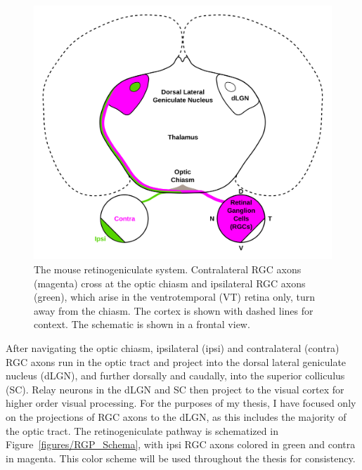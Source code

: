 \begin{figure}[hbtp]
	\begin{center}
		\includegraphics[width=\textwidth]{Figures/RGP_Schema.svg}
		\caption{The mouse retinogeniculate system. Contralateral RGC axons (magenta) cross at the optic chiasm and ipsilateral RGC axons (green), which arise in the ventrotemporal (VT) retina only, turn away from the chiasm. The cortex is shown with dashed lines for context. The schematic is shown in a frontal view.}
		\label{Figures/RGP_Schema}
	\end{center}
\end{figure}
After navigating the optic chiasm, ipsilateral (ipsi) and contralateral (contra) RGC axons run in the optic tract and project into the dorsal lateral geniculate nucleus (dLGN), and further dorsally and caudally, into the superior colliculus (SC).
Relay neurons in the dLGN and SC then project to the visual cortex for higher order visual processing.
For the purposes of my thesis, I have focused only on the projections of RGC axons to the dLGN, as this includes the majority of the optic tract.
The retinogeniculate pathway is schematized in Figure~\ref{figures/RGP_Schema}, with ipsi RGC axons colored in green and contra in magenta.
This color scheme will be used throughout the thesis for consistency.

